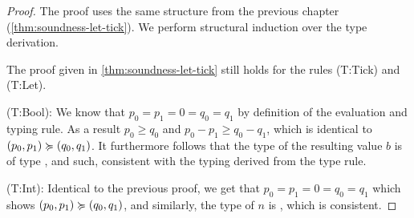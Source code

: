 \begin{proof}
   The proof uses the same structure from the previous chapter (\cref{thm:soundness-let-tick}). We perform structural induction over the type derivation. 

The proof given in \cref{thm:soundness-let-tick} still holds for the rules (T:Tick) and (T:Let).

(T:Bool): We know that \(p_0 = p_1 = 0 = q_0 = q_1\) by definition of the evaluation and typing rule. As a result \(p_0 \geq q_0\) and \(p_0 - p_1 \geq q_0 - q_1\), which is identical to \((p_0, p_1) \succcurlyeq (q_0, q_1)\). It furthermore follows that the type of the resulting value \(b\) is of type \bool, and such, consistent with the typing derived from the type rule.

(T:Int): Identical to the previous proof, we get that \(p_0 = p_1 = 0 = q_0 = q_1\) which shows \((p_0, p_1) \succcurlyeq (q_0, q_1)\), and similarly, the type of \(n\) is \typeint, which is consistent.

\end{proof}





